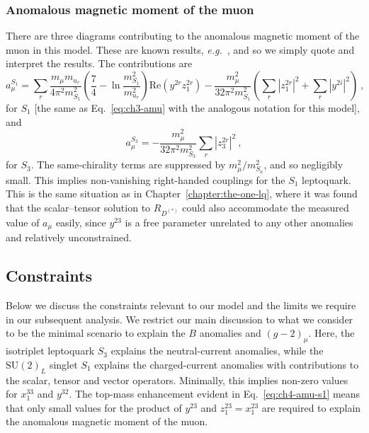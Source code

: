 \subsubsection{Anomalous magnetic moment of the muon}

There are three diagrams contributing to the anomalous magnetic moment of the
muon in this model. These are known results, \textit{e.g.}~\cite{Bauer:2015knc,
  Dorsner:2016wpm}, and so we simply quote and interpret the results. The
contributions are
\begin{equation}
  \label{eq:ch4-amu-s1}
a_\mu^{S_{1}} = \sum_r \frac{m_\mu m_{u_r}}{4\pi^2 m_{S_{1}}^2} \left( \frac{7}{4} - \ln\frac{m_{S_{1}}^2}{m_{u_r}^2}\right) \text{Re} (y^{2r} z_{1}^{2r}) - \frac{m_\mu^2}{32\pi^2 m_{S_{1}}^2} \left(\sum_r |z^{2r}_{1}|^2+ \sum_r |y^{2i}|^2 \right) \ ,
\end{equation}
for $S_{1}$ [the same as Eq.~\eqref{eq:ch3-amu} with the analogous notation for
this model], and
\begin{equation}
a_\mu^{S_{3}} =  - \frac{m_\mu^2}{32\pi^2 m_{S_{3}}^2} \sum_r |z^{2r}_{3}|^2 \ ,
\end{equation}
for $S_{3}$. The same-chirality terms are suppressed by
$m_{\mu}^{2} / m_{S_{a}}^{2}$, and so negligibly small. This implies
non-vanishing right-handed couplings for the $S_{1}$ leptoquark. This is the
same situation as in Chapter~\ref{chapter:the-one-lq}, where it was found that
the scalar--tensor solution to $R_{D^{(*)}}$ could also accommodate the measured
value of $a_{\mu}$ easily, since $y^{23}$ is a free parameter unrelated to any
other anomalies and relatively unconstrained.

\subsection{Constraints}
\label{sec:ch4-innes-constraints}

Below we discuss the constraints relevant to our model and the limits we require
in our subsequent analysis. We restrict our main discussion to what we consider
to be the minimal scenario to explain the $B$ anomalies and $(g-2)_\mu$. Here,
the isotriplet leptoquark $S_{3}$ explains the neutral-current anomalies, while
the $\text{SU}(2)_{L}$ singlet $S_{1}$ explains the charged-current anomalies
with contributions to the scalar, tensor and vector operators. Minimally, this
implies non-zero values for $x_{1}^{33}$ and $y^{32}$. The top-mass enhancement
evident in Eq.~\eqref{eq:ch4-amu-s1} means that only small values for the
product of $y^{23}$ and $z_{1}^{23} = x_{1}^{23}$ are required to explain the
anomalous magnetic moment of the muon.

